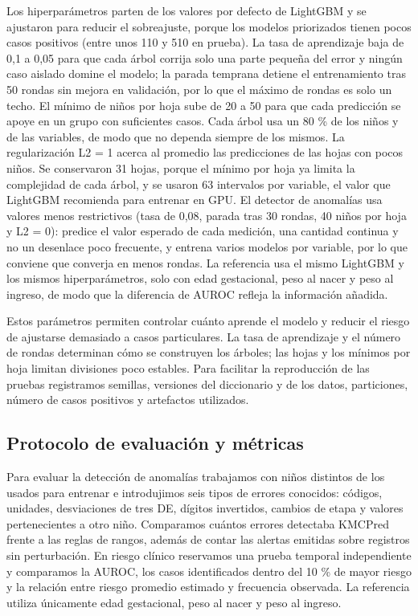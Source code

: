 Los hiperparámetros parten de los valores por defecto de LightGBM y se ajustaron para reducir el sobreajuste, porque los modelos priorizados tienen pocos casos positivos (entre unos 110 y 510 en prueba). La tasa de aprendizaje baja de 0,1 a 0,05 para que cada árbol corrija solo una parte pequeña del error y ningún caso aislado domine el modelo; la parada temprana detiene el entrenamiento tras 50 rondas sin mejora en validación, por lo que el máximo de rondas es solo un techo. El mínimo de niños por hoja sube de 20 a 50 para que cada predicción se apoye en un grupo con suficientes casos. Cada árbol usa un 80 \% de los niños y de las variables, de modo que no dependa siempre de los mismos. La regularización L2 = 1 acerca al promedio las predicciones de las hojas con pocos niños. Se conservaron 31 hojas, porque el mínimo por hoja ya limita la complejidad de cada árbol, y se usaron 63 intervalos por variable, el valor que LightGBM recomienda para entrenar en GPU. El detector de anomalías usa valores menos restrictivos (tasa de 0,08, parada tras 30 rondas, 40 niños por hoja y L2 = 0): predice el valor esperado de cada medición, una cantidad continua y no un desenlace poco frecuente, y entrena varios modelos por variable, por lo que conviene que converja en menos rondas. La referencia usa el mismo LightGBM y los mismos hiperparámetros, solo con edad gestacional, peso al nacer y peso al ingreso, de modo que la diferencia de AUROC refleja la información añadida.

Estos parámetros permiten controlar cuánto aprende el modelo y reducir el riesgo de ajustarse demasiado a casos particulares. La tasa de aprendizaje y el número de rondas determinan cómo se construyen los árboles; las hojas y los mínimos por hoja limitan divisiones poco estables. Para facilitar la reproducción de las pruebas registramos semillas, versiones del diccionario y de los datos, particiones, número de casos positivos y artefactos utilizados.

\subsection{Protocolo de evaluación y métricas}
\label{sec:3.6}

Para evaluar la detección de anomalías trabajamos con niños distintos de los usados para entrenar e introdujimos seis tipos de errores conocidos: códigos, unidades, desviaciones de tres DE, dígitos invertidos, cambios de etapa y valores pertenecientes a otro niño. Comparamos cuántos errores detectaba KMCPred frente a las reglas de rangos, además de contar las alertas emitidas sobre registros sin perturbación. En riesgo clínico reservamos una prueba temporal independiente y comparamos la AUROC, los casos identificados dentro del 10 \% de mayor riesgo y la relación entre riesgo promedio estimado y frecuencia observada. La referencia utiliza únicamente edad gestacional, peso al nacer y peso al ingreso.

